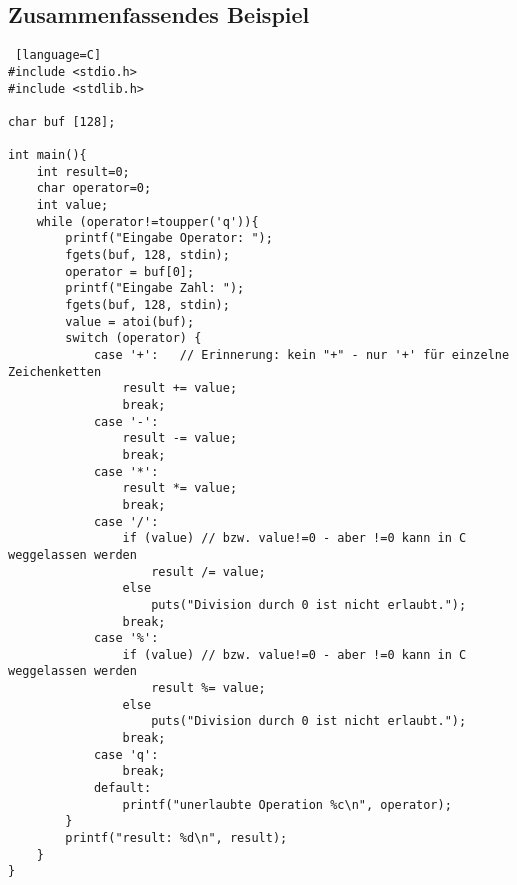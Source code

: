 \subsection{Zusammenfassendes Beispiel}

\begin{lstlisting} [language=C]
#include <stdio.h>
#include <stdlib.h>

char buf [128];

int main(){
	int result=0;
	char operator=0;
	int value;
	while (operator!=toupper('q')){
		printf("Eingabe Operator: ");
		fgets(buf, 128, stdin);
		operator = buf[0];
		printf("Eingabe Zahl: ");
		fgets(buf, 128, stdin);
		value = atoi(buf);
		switch (operator) {
			case '+':	// Erinnerung: kein "+" - nur '+' für einzelne Zeichenketten
				result += value;
				break;
			case '-':
				result -= value;
				break;
			case '*':
				result *= value;
				break;
			case '/':
				if (value) // bzw. value!=0 - aber !=0 kann in C weggelassen werden
					result /= value;
				else
					puts("Division durch 0 ist nicht erlaubt.");
				break;
			case '%':
				if (value) // bzw. value!=0 - aber !=0 kann in C weggelassen werden
					result %= value;
				else
					puts("Division durch 0 ist nicht erlaubt.");
				break;
			case 'q':
				break;		
			default: 
				printf("unerlaubte Operation %c\n", operator);
		}
		printf("result: %d\n", result);
	}
}
\end{lstlisting}

